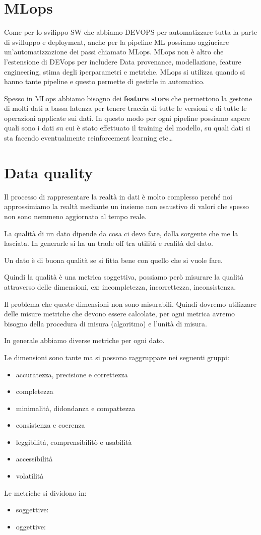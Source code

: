 \section{MLops}
Come per lo svilippo SW che abbiamo DEVOPS per automatizzare tutta la parte di 
svilluppo e deployment, anche per la pipeline ML possiamo aggiuciare un'automatizzazione
dei passi chiamato MLops. MLops non è altro che l'estensione di DEVops per includere 
Data provenance, modellazione, feature engineering, stima degli iperparametri 
e metriche. MLops si utilizza quando si hanno tante pipeline e questo permette 
di gestirle in automatico.

Spesso in MLops abbiamo bisogno dei \textbf{feature store} che permettono la
gestone di molti dati a bassa latenza per tenere traccia di tutte le versioni e 
di tutte le operazioni applicate sui dati. In questo modo per ogni pipeline possiamo 
sapere quali sono i dati su cui è stato effettuato il training del modello, su
quali dati si sta facendo eventualmente reinforcement learning etc\dots

\section{Data quality}
Il processo di rappresentare la realtà in dati è molto complesso perché noi 
approssimiamo la realtà mediante un insieme non esaustivo di valori che spesso 
non sono nemmeno aggiornato al tempo reale. 

La qualità di un dato dipende da cosa ci devo fare, dalla sorgente che me la 
lasciata. In generarle si ha un trade off tra utilità e realità del dato.

\begin{definizione}
      Un dato è di buona qualità se si fitta bene con quello che si vuole fare.
\end{definizione}

Quindi la qualità è una metrica soggettiva, possiamo però misurare la qualità 
attraverso delle dimensioni, ex: incompletezza, incorrettezza, inconsistenza. 

Il problema che queste dimensioni non sono misurabili. Quindi dovremo utilizzare delle misure 
metriche che devono essere calcolate, per ogni metrica avremo bisogno della procedura di 
misura (algoritmo) e l'unità di misura. 

In generale abbiamo diverse metriche per ogni dato.

Le dimensioni sono tante ma si possono raggruppare nei seguenti gruppi:
\begin{itemize}
      \item accuratezza, precisione e correttezza
      \item completezza
      \item minimalità, didondanza e compattezza
      \item consistenza e coerenza
      \item leggibilità, comprensibilitò e usabilità
      \item accessibilità
      \item volatilità
\end{itemize}

Le metriche si dividono in:
\begin{itemize}
      \item soggettive: 
      \item oggettive:
\end{itemize}

